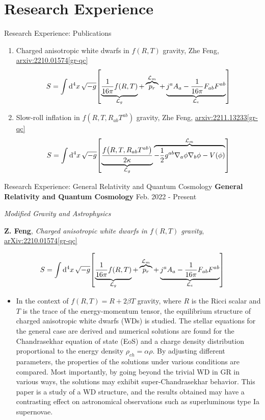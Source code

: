 \documentclass[9pt,aspectratio=169,hyperref=colorlinks]{beamer}
\begin{document}
\section{Research Experience}
\begin{frame}{Research Experience: Publications}
    \begin{enumerate}
        \item Charged anisotropic white dwarfs in $f\left({R}, {T}\right)$ gravity, Zhe Feng, \href{https://arxiv.org/abs/2210.01574}{arxiv:2210.01574[gr-qc]} \[S = \int \dd[4]{x} \sqrt{-g} \qty[\underbrace{\frac{1}{16 \pi} f(R, T)}_{\mathcal{L}_g} + \overbrace{p_r}^{\mathcal{L}_m} + \underbrace{j^a A_a - \frac{1}{16 \pi} F_{ab} F^{ab}}_{\mathcal{L}_e}]\]
        \item Slow-roll inflation in $f\left(R, T, R_{ab}T^{ab}\right)$ gravity, Zhe Feng, \href{https://arxiv.org/abs/2211.13233}{arxiv:2211.13233[gr-qc]} \[S = \int \dd[4]{x} \sqrt{-g} \qty[\underbrace{\frac{f\qty(R, T, R_{ab}T^{ab})}{2 \kappa}}_{\mathcal{L}_g} \overbrace{- \frac{1}{2} g^{ab} \nabla_{a} \phi \nabla_{b} \phi - V(\phi)}^{\mathcal{L}_m}]\]
    \end{enumerate}
\end{frame}

\begin{frame}{Research Experience: General Relativity and Quantum Cosmology}
    \textbf{General Relativity and Quantum Cosmology} \hfill Feb. 2022 - Present

    \smallskip \quad \textit{Modified Gravity and Astrophysics}

    \textbf{Z. Feng}, \textit{Charged anisotropic white dwarfs in $f\left({R}, {T}\right)$ gravity}, \href{https://arxiv.org/abs/2210.01574}{arXiv:2210.01574[gr-qc]}

    \[S = \int \dd[4]{x} \sqrt{-g} \qty[\underbrace{\frac{1}{16 \pi} f(R, T)}_{\mathcal{L}_g} + \overbrace{p_r}^{\mathcal{L}_m} + \underbrace{j^a A_a - \frac{1}{16 \pi} F_{ab} F^{ab}}_{\mathcal{L}_e}]\]

    \begin{itemize}
        \item In the context of $f(R, T) = R + 2 \beta T$ gravity, where $R$ is the Ricci scalar and $T$ is the trace of the energy-momentum tensor, the equilibrium structure of charged anisotropic white dwarfs (WDs) is studied. The stellar equations for the general case are derived and numerical solutions are found for the Chandrasekhar equation of state (EoS) and a charge density distribution proportional to the energy density $\rho_{ch} = \alpha \rho$. By adjusting different parameters, the properties of the solutions under various conditions are compared. Most importantly, by going beyond the trivial WD in GR in various ways, the solutions may exhibit super-Chandrasekhar behavior. This paper is a study of a WD structure, and the results obtained may have a contrasting effect on astronomical observations such as superluminous type Ia supernovae.
    \end{itemize}
\end{frame}
\end{document}
